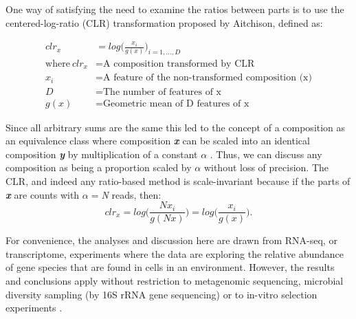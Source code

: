 \documentclass [10pt]{article}
\begin{document}
One way of satisfying the need to examine the ratios between parts is to use the centered-log-ratio (CLR) transformation proposed by Aitchison, defined as: 

\begin{equation}
\begin{split}
clr_x &= log  \big( \frac{x_i}{g(x)}   \big)_{i=1,\dots,D} \\
\text{where}~
	clr_x &= \text{A composition transformed by CLR} \\
	x_i &= \text{A feature of the non-transformed composition (x)} \\
	D &= \text{The number of features of x} \\ 
	g(x) &= \text{Geometric mean of D features of x}
\end{split}
\label{eq:CLR}
\end{equation}

Since all arbitrary sums are the same this led to the concept of a composition as an equivalence class where composition \textit{\bf{x}} can be scaled into an identical composition \textit{\textbf{y}} by multiplication of a constant $\alpha$ . Thus, we can discuss any composition as being a proportion scaled by $\alpha$ without loss of precision. The CLR, and indeed any ratio-based method is scale-invariant because if the parts of \textit{\textbf{x}} are counts with $\alpha=$\textit{N} reads, then: 
\begin{equation}
	clr_x= log\big( \frac{Nx_i}{g(Nx)}   \big) =  log\big( \frac{x_i}{g(x)}  \big).
\label{eq:equip}
\end{equation}

For convenience, the analyses and discussion here are drawn from RNA-seq, or transcriptome, experiments where the data are exploring the relative abundance of gene species that are found in cells in an environment. However, the results and conclusions apply without restriction to metagenomic sequencing, microbial diversity sampling (by 16S rRNA gene sequencing) or to in-vitro selection experiments . 
\end{document}
